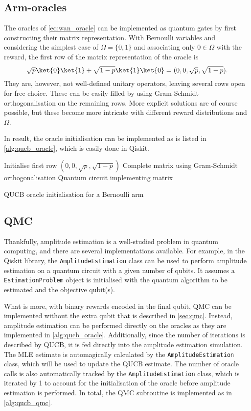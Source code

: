 \subsection{Arm-oracles}
The oracles of \cref{eq:wan_oracle} can be implemented as quantum gates by first constructing their matrix representation.
With Bernoulli variables and considering the simplest case of $\Omega = \{0, 1\}$ and associating only $0 \in \Omega$ with the reward, the first row of the matrix representation of the oracle is
\begin{equation}
    \sqrt{p} \ket{0} \ket{1} + \sqrt{1-p} \ket{1} \ket{0}
    =
    (0, 0, \sqrt{p}, \sqrt{1-p}).
\end{equation}
They are, however, not well-defined unitary operators, leaving several rows open for free choice.
These can be easily filled by using Gram-Schmidt orthogonalisation on the remaining rows.
More explicit solutions are of course possible, but these become more intricate with different reward distributions and $\Omega$.

In result, the oracle initialisation can be implemented as is listed in \cref{alg:qucb_oracle}, which is easily done in Qiskit.

\begin{algorithm}
    \SetAlgoLined
    Initialise first row $(0, 0, \sqrt{p}, \sqrt{1-p})$ \;
    Complete matrix using Gram-Schmidt orthogonalisation \;
    \Return Quantum circuit implementing matrix
    \caption{QUCB oracle initialisation for a Bernoulli arm}
    \label{alg:qucb_oracle}
\end{algorithm}

\subsection{QMC}
Thankfully, amplitude estimation is a well-studied problem in quantum computing, and there are several implementations available.
For example, in the Qiskit library, the \texttt{AmplitudeEstimation} class can be used to perform amplitude estimation on a quantum circuit with a given number of qubits.
It assumes a \texttt{EstimationProblem} object is initialised with the quantum algorithm to be estimated and the objective qubit(s).

What is more, with binary rewards encoded in the final qubit, QMC can be implemented without the extra qubit that is described in \cref{sec:qmc}.
Instead, amplitude estimation can be performed directly on the oracles as they are implemented in \cref{alg:qucb_oracle}.
Additionally, since the number of iterations is described by QUCB, it is fed directly into the amplitude estimation simulation.
The MLE estimate is automagically calculated by the \texttt{AmplitudeEstimation} class, which will be used to update the QUCB estimate.
The number of oracle calls is also automatically tracked by the \texttt{AmplitudeEstimation} class, which is iterated by 1 to account for the initialisation of the oracle before amplitude estimation is performed.
In total, the QMC subroutine is implemented as in \cref{alg:qucb_qmc}.

